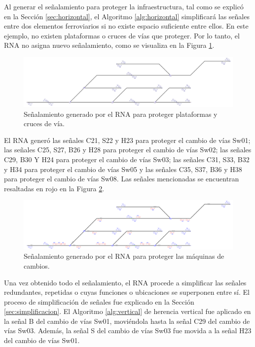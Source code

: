 	Al generar el señalamiento para proteger la infraestructura, tal como se explicó en la Sección \ref{sec:horizontal}, el Algoritmo \ref{alg:horizontal} simplificará las señales entre dos elementos ferroviarios si no existe espacio suficiente entre ellos. En este ejemplo, no existen plataformas o cruces de vías que proteger. Por lo tanto, el RNA no asigna nuevo señalamiento, como se visualiza en la Figura \ref{fig:EJ6_5}.

	\begin{figure}[H]
		\centering
		\includegraphics[width=1\textwidth]{resultados-obtenidos/ejemplo6/images/6_step3.png}
		\centering\caption{Señalamiento generado por el RNA para proteger plataformas y cruces de vía.}
		\label{fig:EJ6_5}
	\end{figure}

	El RNA generó las señales C21, S22 y H23 para proteger el cambio de vías Sw01; las señales C25, S27, B26 y H28 para proteger el cambio de vías Sw02; las señales C29, B30 Y H24 para proteger el cambio de vías Sw03; las señales C31, S33, B32 y H34 para proteger el cambio de vías Sw05 y las señales C35, S37, B36 y H38 para proteger el cambio de vías Sw08. Las señales mencionadas se encuentran resaltadas en rojo en la Figura \ref{fig:EJ6_6}.
	 \begin{figure}[H]
		\centering
		\includegraphics[width=1\textwidth]{resultados-obtenidos/ejemplo6/images/6_step4.png}
		\centering\caption{Señalamiento generado por el RNA para proteger las máquinas de cambios.}
		\label{fig:EJ6_6}
	\end{figure}
	
	Una vez obtenido todo el señalamiento, el RNA procede a simplificar las señales redundantes, repetidas o cuyas funciones o ubicaciones se superponen entre sí. El proceso de simplificación de señales fue explicado en la Sección \ref{sec:simplificacion}. El Algoritmo \ref{alg:vertical} de herencia vertical fue aplicado en la señal B del cambio de vías Sw01, moviéndola hasta la señal C29 del cambio de vías Sw03. Además, la señal S del cambio de vías Sw03 fue movida a la señal H23 del cambio de vías Sw01.
	
